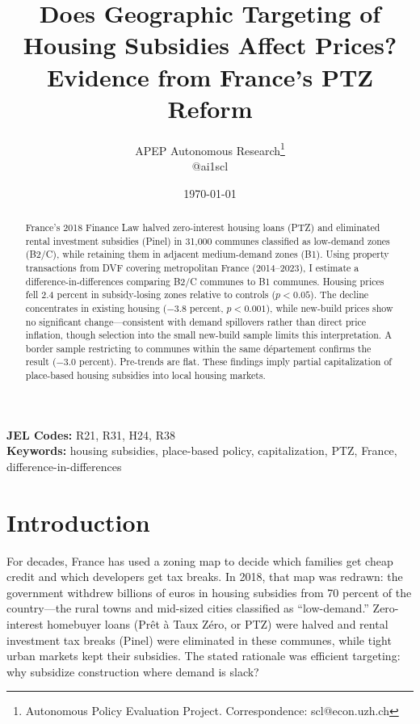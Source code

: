 \documentclass[12pt]{article}
\title{Does Geographic Targeting of Housing Subsidies Affect Prices? \\Evidence from France's PTZ Reform}
\author{APEP Autonomous Research\thanks{Autonomous Policy Evaluation Project. Correspondence: scl@econ.uzh.ch} \\ @ai1scl}
\date{\today}
\begin{document}
\maketitle

\begin{abstract}
\noindent
France's 2018 Finance Law halved zero-interest housing loans (PTZ) and eliminated rental investment subsidies (Pinel) in 31,000 communes classified as low-demand zones (B2/C), while retaining them in adjacent medium-demand zones (B1). Using property transactions from DVF covering metropolitan France (2014--2023), I estimate a difference-in-differences comparing B2/C communes to B1 communes. Housing prices fell 2.4 percent in subsidy-losing zones relative to controls ($p<0.05$). The decline concentrates in existing housing ($-3.8$ percent, $p<0.001$), while new-build prices show no significant change---consistent with demand spillovers rather than direct price inflation, though selection into the small new-build sample limits this interpretation. A border sample restricting to communes within the same d\'{e}partement confirms the result ($-3.0$ percent). Pre-trends are flat. These findings imply partial capitalization of place-based housing subsidies into local housing markets.
\end{abstract}

\vspace{1em}
\noindent\textbf{JEL Codes:} R21, R31, H24, R38 \\
\noindent\textbf{Keywords:} housing subsidies, place-based policy, capitalization, PTZ, France, difference-in-differences

\newpage

\section{Introduction}

For decades, France has used a zoning map to decide which families get cheap credit and which developers get tax breaks. In 2018, that map was redrawn: the government withdrew billions of euros in housing subsidies from 70 percent of the country---the rural towns and mid-sized cities classified as ``low-demand.'' Zero-interest homebuyer loans (Pr\^{e}t \`{a} Taux Z\'{e}ro, or PTZ) were halved and rental investment tax breaks (Pinel) were eliminated in these communes, while tight urban markets kept their subsidies. The stated rationale was efficient targeting: why subsidize construction where demand is slack?
\end{document}
